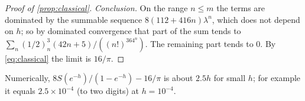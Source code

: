 \begin{proof}[Proof of \cref{prop:classical}]
\emph{Conclusion.} On the range $n\le m$ the terms are dominated by the summable
sequence $8(112+416n)\lambda^n$, which does not depend on $h$; so by dominated
convergence that part of the sum tends to
$\sum_n(1/2)_n^3(42n+5)/((n!)^364^n)$. The remaining part tends to $0$. By
\eqref{eq:classical} the limit is $16/\pi$.
\end{proof}

\begin{remark}
Numerically, $8S(e^{-h})/(1-e^{-h})-16/\pi$ is about $2.5h$ for small $h$; for
example it equals $2.5\times10^{-4}$ (to two digits) at $h=10^{-4}$.
\end{remark}
